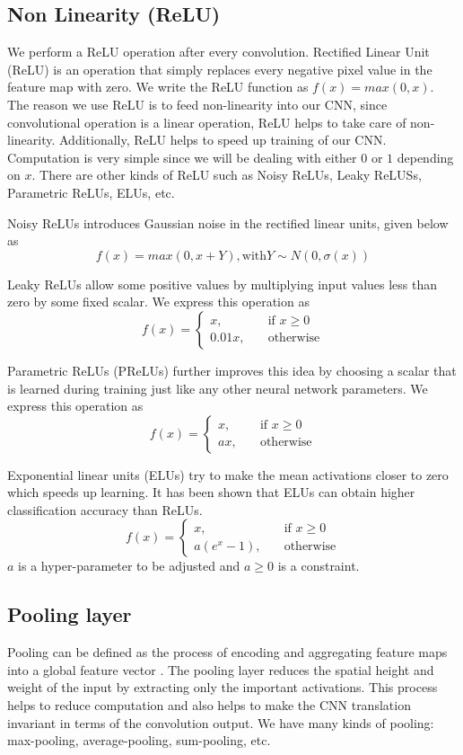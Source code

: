 \documentclass[master]{thesis-uestc}
\begin{document}
\subsection{Non Linearity (ReLU)}
We perform a ReLU operation after every convolution. Rectified Linear Unit (ReLU) is an operation that simply replaces every negative pixel value in the feature map with zero. We write the ReLU function as $f(x) = max(0,x)$. The reason we use ReLU is to feed non-linearity into our CNN, since convolutional operation is a linear operation, ReLU helps to take care of non-linearity. Additionally, ReLU helps to speed up training of our CNN. Computation is very simple since we will be dealing with either $0$ or $1$ depending on $x$. There are other kinds of ReLU such as Noisy ReLUs\cite{Nair:2010:RLU:3104322.3104425}, Leaky ReLUSs\cite{Maas2013RectifierNI}, Parametric ReLUs\cite{7410480}, ELUs\cite{Clevert2015FastAA}, etc.

Noisy ReLUs introduces Gaussian noise in the rectified linear units, given below as
\[ f(x) = max(0, x + Y), \text{with} Y \sim N(0, \sigma(x))\]

Leaky ReLUs allow some positive values by multiplying input values less than zero by some fixed scalar. We express this operation as
\[ f(x) =
  \begin{cases}
    x, & \quad  \text{if } x \geq 0\\
    0.01x, & \quad \text{otherwise}
  \end{cases}
\]

Parametric ReLUs (PReLUs) further improves this idea by choosing a scalar that is learned during training just like any other neural network parameters. We express this operation as
\[ f(x) =
  \begin{cases}
    x, & \quad  \text{if } x \geq 0\\
    ax, & \quad \text{otherwise}
  \end{cases}
\]

Exponential linear units (ELUs) try to make the mean activations closer to zero which speeds up learning. It has been shown that ELUs can obtain higher classification accuracy than ReLUs.
\[ f(x) =
  \begin{cases}
    x, & \quad  \text{if } x \geq 0\\
    a(e^x - 1), & \quad \text{otherwise}
  \end{cases}
\]
$a$ is a hyper-parameter to be adjusted and $a \geq 0$ is a constraint.

\subsection{Pooling layer}
Pooling can be defined as the process of encoding and aggregating feature maps into a global feature vector \cite{cui2017cvpr}. The pooling layer reduces the spatial height and weight of the input by extracting only the important activations. This process helps to reduce computation and also helps to make the CNN translation invariant in terms of the convolution output. We have many kinds of pooling: max-pooling, average-pooling, sum-pooling, etc.
\end{document}

